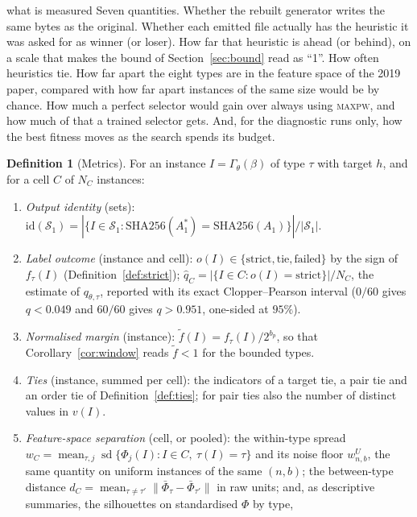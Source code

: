 \documentclass[a4paper,11pt]{article}
\newcommand{\bp}{b_{p}}
\newcommand{\Gam}{\Gamma_{\theta}}
\newcommand{\Aone}{A_{1}}
\newcommand{\Astar}{A_{1}^{*}}
\newcommand{\MAXPW}{\textsc{maxpw}}
\theoremstyle{plain}
\theoremstyle{definition}
\newtheorem{definition}{Definition}
\theoremstyle{remark}
\begin{document}
\begin{plain}{what is measured}
Seven quantities. Whether the rebuilt generator writes the same bytes as the original. Whether
each emitted file actually has the heuristic it was asked for as winner (or loser). How far
that heuristic is ahead (or behind), on a scale that makes the bound of
Section~\ref{sec:bound} read as ``1''. How often heuristics tie. How far apart the eight
types are in the feature space of the 2019 paper, compared with how far apart instances of
the same size would be by chance. How much a perfect selector would gain over always using
\MAXPW, and how much of that a trained selector gets. And, for the diagnostic runs only, how
the best fitness moves as the search spends its budget.
\end{plain}

\begin{definition}[Metrics]\label{def:metrics}
For an instance $I=\Gam(\beta)$ of type $\tau$ with target $h$, and for a cell $C$ of
$N_C$ instances:
\begin{enumerate}[leftmargin=1.8em,itemsep=2pt]
\item \emph{Output identity} (sets): $\mathrm{id}(\mathcal S_1)=|\{I\in\mathcal S_1:
\mathrm{SHA256}(\Astar)=\mathrm{SHA256}(\Aone)\}|/|\mathcal S_1|$.
\item \emph{Label outcome} (instance and cell):
$o(I)\in\{\text{strict},\text{tie},\text{failed}\}$ by the sign of $f_\tau(I)$
(Definition~\ref{def:strict});
$\hat q_C=|\{I\in C:o(I)=\text{strict}\}|/N_C$, the estimate of $q_{\theta,\tau}$, reported with
its exact Clopper--Pearson interval ($0/60$ gives $q<0.049$ and $60/60$ gives $q>0.951$, one-sided
at $95\%$).
\item \emph{Normalised margin} (instance): $\tilde f(I)=f_\tau(I)/2^{\bp}$, so that
Corollary~\ref{cor:window} reads $\tilde f<1$ for the bounded types.
\item \emph{Ties} (instance, summed per cell): the indicators of a target tie, a pair tie
and an order tie of Definition~\ref{def:ties}; for pair ties also the number of distinct
values in $v(I)$.
\item \emph{Feature-space separation} (cell, or pooled): the within-type spread
$w_C=\operatorname{mean}_{\tau,j}\operatorname{sd}\{\Phi_j(I):I\in C,\ \tau(I)=\tau\}$ and its
noise floor $w^{U}_{n,b}$, the same quantity on uniform instances of the same $(n,b)$; the
between-type distance $d_C=\operatorname{mean}_{\tau\ne\tau'}\lVert\bar\Phi_\tau-\bar\Phi_{\tau'}\rVert$
in raw units; and, as descriptive summaries, the silhouettes on standardised $\Phi$ by type,

\end{enumerate}
\end{definition}
\end{document}
